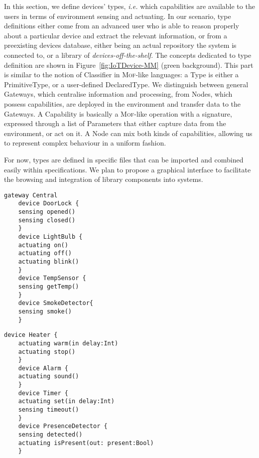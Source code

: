In this section, we define \IOT devices' types, \textit{i.e.} which capabilities are available to the users in terms of environment sensing and actuating. In our scenario, type definitions either come from an advanced user who is able to reason properly about a particular device and extract the relevant information, or from a preexisting devices database, either being an actual repository the system is connected to, or a library of \textit{devices-off-the-shelf}. The concepts dedicated to type definition are shown in Figure~\ref{fig:IoTDevice-MM} (green background). This part is similar to the notion of \textsf{Classifier} in \textsc{Mof}-like languages: a \textsf{Type} is either a \textsf{PrimitiveType}, or a user-defined \textsf{DeclaredType}. We distinguish between general \textsf{Gateway}s, which centralise information and processing, from \textsf{Node}s, which possess capabilities, are deployed in the environment and transfer data to the \textsf{Gateway}s. A \textsf{Capability} is basically a \textsc{Mof}-like operation with a signature, expressed through a list of \textsf{Parameter}s that either capture data from the environment, or act on it. A \textsf{Node} can mix both kinds of capabilities, allowing us to represent complex behaviour in a uniform fashion.

For now, types are defined in specific files that can be imported and combined easily within \IOT specifications. We plan to propose a graphical interface to facilitate the browsing and integration of library components into \IOT systems.

\begin{center}
  \begin{minipage}[t]{.38\linewidth}
    \begin{lstlisting}[language=iotdsl]	
    gateway Central
    device DoorLock {
    sensing opened()
    sensing closed()
    }
    device LightBulb {
    actuating on()
    actuating off()
    actuating blink()
    }	
    device TempSensor {
    sensing getTemp()
    }
    device SmokeDetector{
    sensing smoke()
    }
    \end{lstlisting}
  \end{minipage}\hfill
  \begin{minipage}[t]{.52\linewidth}
    \begin{lstlisting}[language=iotdsl, firstnumber=17]
    device Heater {
    actuating warm(in delay:Int)
    actuating stop()
    }
    device Alarm {
    actuating sound()
    }
    device Timer {
    actuating set(in delay:Int)
    sensing timeout()
    }
    device PresenceDetector {
    sensing detected()
    actuating isPresent(out: present:Bool)
    }
    
    \end{lstlisting}
  \end{minipage}
  \label{lis:RE-TypeDeclarations}
\end{center}


